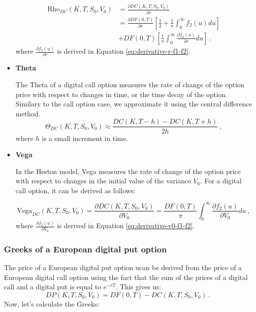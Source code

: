 \begin{itemize}
$$
\begin{aligned}
\text{Rho}_{DC}(K,T,S_0,V_0) &= 
\frac{ \partial DC(K,T, S_0, V_0) }{\partial r} 
\\ &=
\frac{\partial DF(0,T)}{\partial r}  \left[ \frac{1}{2} + \frac{1}{\pi}\int_0^{\infty}f_2(u) du \right]  
\\
&+
 DF(0,T)  \left[\frac{1}{\pi}\int_0^{\infty} \frac{ \partial f_2(u)}{\partial r}  du \right] \ .
\end{aligned}
$$
where $\frac{\partial f_2(u)}{\partial r}$ is derived in Equation \ref{eq:derivative-r-f1-f2}.




\item \textbf{Theta} 

The Theta of a digital call option measures the rate of change of the option price with respect to changes in time, or the time decay of the option. Similary to the call option case, we approximate it using the central difference method. 
$$
 \Theta_{DC}(K,T,S_0,V_0) \approx \frac{DC(K,T-h) - DC(K,T+h)}{2h} \  ,
$$
where $h$ is a small increment in time. 


\item \textbf{Vega} 

In the Heston model, Vega measures the rate of change of the option price with respect to changes in the initial value of the variance $V_0$. For a digital call option, it can be derived as follows:

$$
\text{Vega}_{DC}(K,T,S_0,V_0) = \frac{\partial DC(K,T, S_0, V_0)}{\partial V_0} =  \frac{DF(0,T)  }{\pi}\int_0^{\infty}\frac{\partial f_2(u)}{\partial V_0} du \ ,
$$
where $\frac{\partial f_2(u)}{\partial V_0}$ is derived in Equation \ref{eq:derivative-v0-f1-f2}.


\end{itemize}













\subsubsection{Greeks of a European digital put option}

The price of a European digital put option ucan be derived from the price of a European digital call option using the fact that the sum of the prices of a digital call and a digital put is equal to $e^{-rT}$. This gives us:
$$
DP(K,T, S_0, V_0) = DF(0,T) - DC(K,T,  S_0, V_0) \ .
$$
Now, let's calculate the Greeks:

